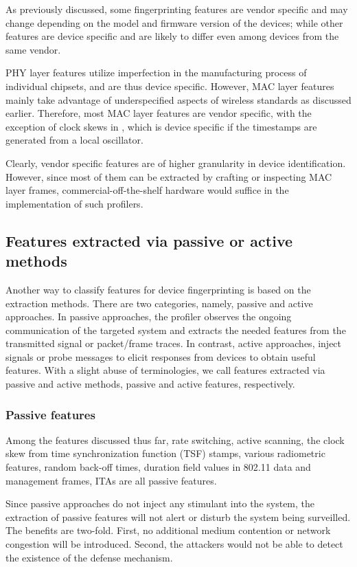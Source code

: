 \documentclass[journal,draftcls,onecolumn,11pt]{IEEEtran}
\begin{document}
As previously discussed, some fingerprinting features are vendor specific and may change depending on the model and firmware version of the devices; while other features are device specific and are likely to differ even among devices from the same vendor.

PHY layer features utilize imperfection in the manufacturing process of individual chipsets, and are thus device specific. However, MAC layer features mainly take advantage of underspecified aspects of wireless standards as discussed earlier. Therefore, most MAC layer features are vendor specific, with the exception of clock skews in \cite{Brik2008,Dolatshahi2010,Polak2011}, which is device specific if the timestamps are generated from a local oscillator.

Clearly, vendor specific features are of higher granularity in device identification. However, since most of them can be extracted by crafting or inspecting MAC layer frames, commercial-off-the-shelf hardware would suffice in the implementation of such profilers.

\subsection{Features extracted via passive or active methods}

Another way to classify features for device fingerprinting is based on the extraction methods. There are two categories, namely, passive and active approaches. In passive approaches, the profiler observes the ongoing communication of the targeted system and extracts the needed features from the transmitted signal or packet/frame traces. In contrast, active approaches, inject signals or probe messages to elicit responses from devices to obtain useful features. With a slight abuse of terminologies, we call features extracted via passive and active methods, passive and active features, respectively.

\subsubsection{Passive features}

Among the features discussed thus far, rate switching, active scanning, the clock skew from time synchronization function (TSF) stamps, various radiometric features, random back-off times, duration field values in 802.11 data and management frames, ITAs are all passive features.

Since passive approaches do not inject any stimulant into the system, the extraction of passive features will not alert or disturb the system being surveilled. The benefits are two-fold. First, no additional medium contention or network congestion will be introduced. Second, the attackers would not be able to detect the existence of the defense mechanism.
\end{document}
